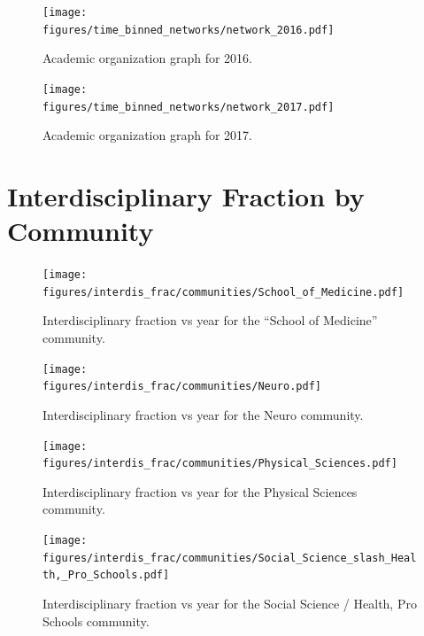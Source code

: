 \documentclass[notitlepage,aps,prd,nofootinbib]{revtex4-1}
\newcommand{\figures}{../outputs/plots}
\begin{document}
\begin{figure}[!htb]\centering
  \texttt{[image: \\figures/time\_binned\_networks/network\_2016.pdf]}
  \caption{Academic organization graph for 2016.}
\end{figure}

\begin{figure}[!htb]\centering
  \texttt{[image: \\figures/time\_binned\_networks/network\_2017.pdf]}
  \caption{Academic organization graph for 2017.}
\end{figure}


\appendix*
\section{Interdisciplinary Fraction by Community}

\begin{figure}[!htb]\centering
  \texttt{[image: \\figures/interdis\_frac/communities/School\_of\_Medicine.pdf]}
  \caption{Interdisciplinary fraction vs year for the ``School of Medicine'' community.}
\end{figure}

\begin{figure}[!htb]\centering
  \texttt{[image: \\figures/interdis\_frac/communities/Neuro.pdf]}
  \caption{Interdisciplinary fraction vs year for the Neuro community.}
\end{figure}

\begin{figure}[!htb]\centering
  \texttt{[image: \\figures/interdis\_frac/communities/Physical\_Sciences.pdf]}
  \caption{Interdisciplinary fraction vs year for the Physical Sciences community.}
\end{figure}

\begin{figure}[!htb]\centering
  \texttt{[image: \\figures/interdis\_frac/communities/Social\_Science\_slash\_Health,\_Pro\_Schools.pdf]}
  \caption{Interdisciplinary fraction vs year for the Social Science / Health, Pro Schools community.}
\end{figure}
\end{document}
